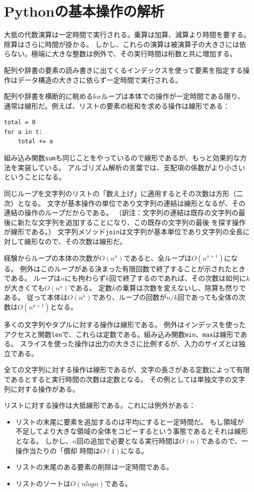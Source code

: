\documentclass[a4j,12pt,makeidx]{jbook}
\begin{document}
\section{Pythonの基本操作の解析}
大抵の代数演算は一定時間で実行される。乗算は加算、減算より時間を要する。除算はさらに時間が掛かる。
しかし、これらの演算は被演算子の大きさには依らない。極端に大きな整数は例外で、その実行時間は桁数と共に増加する。\par
配列や辞書の要素の読み書きに出てくるインデックスを使って要素を指定する操作はデータ構造の大きさに依らず一定時間で実行される。\par
配列や辞書を横断的に眺めるforループは本体での操作が一定時間である限り、通常は線形だ。例えば、リストの要素の総和を求める操作は線形である：
\begin{verbatim}
total = 0
for a in t:
    total += a
\end{verbatim}
組み込み関数{\tt sum}も同じことをやっているので線形であるが、もっと効果的な方法を実装している。
アルゴリズム解析の言葉では、支配項の係数がより小さいということになる。\par
同じループを文字列のリストの「数え上げ」に適用するとその次数は方形（二次）となる。
文字が基本操作の単位であり文字列の連結は線形となるが、その連結の操作のループだからである。
（訳注：文字列の連結は既存の文字列の最後に新たな文字列を追加することになり、この既存の文字列の最後
を探す操作が線形である。）
文字列メソッド{\tt join}は文字列が基本単位であり文字列の全長に対して線形なので、その次数は線形だ。\par
経験からループの本体の次数が$O(n^a)$であると、全ループは$O(n^{a+1})$になる。
例外はこのループがある決まった有限回数で終了することが示されたときである。
ループは$n$にも拘わらず$k$回で終了するのであれば、その次数は如何に$k$が大きくても$O(n^a)$である。
定数$k$の乗算は次数を変えないし、除算も然りである。
従って本体は$O(n^a)$であり、ループの回数が$n/k$回であっても全体の次数は$O(n^{a+1})$となる。\par
多くの文字列やタプルに対する操作は線形である。
例外はインデッスを使ったアクセスと関数{\tt len}で、これらは定数である。組み込み関数{\tt min}、{\tt max}は線形である。
スライスを使った操作は出力の大きさに比例するが、入力のサイズとは独立である。\par
全ての文字列に対する操作は線形であるが、文字の長さがある定数によって有限であるとすると実行時間の次数は定数となる。
その例としては単独文字の文字列に対する操作がある。\par
リストに対する操作は大抵線形である。これには例外がある：
\begin{itemize}
\item リストの末尾に要素を追加するのは平均にすると一定時間だ。
もし領域が不足してより大きな領域の全体をコピーするという事態であるとそれは線形となる。
しかし、$n$回の追加で必要となる実行時間は$O(n)$であるので、一操作当たりの「償却
時間は$O(1)$になる。
\item リストの末尾のある要素の削除は一定時間である。
\item リストのソートは$O(nlogn)$である。
\end{itemize}
\end{document}

